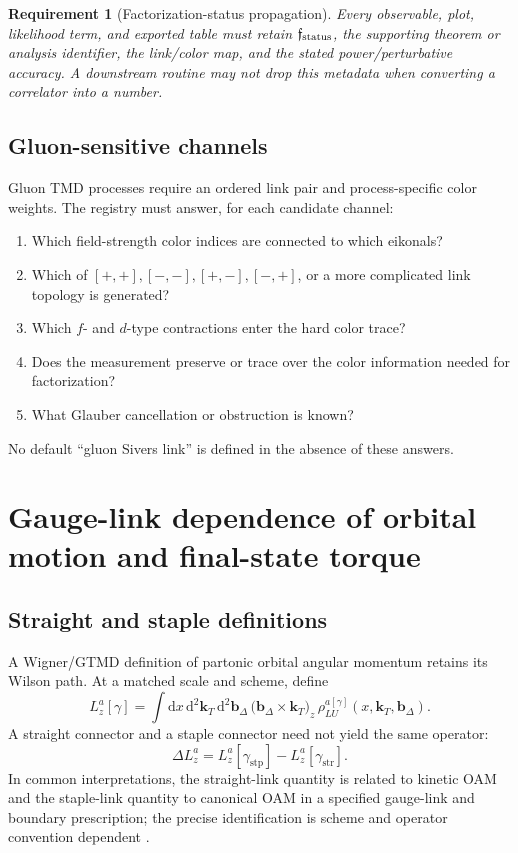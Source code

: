 \documentclass[11pt]{article}
\newtheorem{requirement}[definition]{Requirement}
\newcommand{\kT}{\bm{k}_{T}}
\newcommand{\bD}{\bm{b}_{\Delta}}
\newcommand{\dd}{\mathrm{d}}
\newcommand{\crossT}[2]{\bigl(#1\!\times\!#2\bigr)_z}
\newcommand{\straight}{\mathrm{str}}
\newcommand{\staple}{\mathrm{stp}}
\begin{document}
\begin{requirement}[Factorization-status propagation]
\label{req:factorization-status-propagation}
Every observable, plot, likelihood term, and exported table must retain
\(\mathfrak f_{\rm status}\), the supporting theorem or analysis identifier,
the link/color map, and the stated power/perturbative accuracy.  A downstream
routine may not drop this metadata when converting a correlator into a number.
\end{requirement}

\subsection{Gluon-sensitive channels}

Gluon TMD processes require an ordered link pair and process-specific color
weights.  The registry must answer, for each candidate channel:
\begin{enumerate}
\item Which field-strength color indices are connected to which eikonals?
\item Which of \([+,+],[-,-],[+,-],[-,+]\), or a more complicated link
      topology is generated?
\item Which \(f\)- and \(d\)-type contractions enter the hard color trace?
\item Does the measurement preserve or trace over the color information needed
      for factorization?
\item What Glauber cancellation or obstruction is known?
\end{enumerate}
No default ``gluon Sivers link'' is defined in the absence of these answers.

\section{Gauge-link dependence of orbital motion and final-state torque}
\label{sec:oam-torque}

\subsection{Straight and staple definitions}

A Wigner/GTMD definition of partonic orbital angular momentum retains its
Wilson path.  At a matched scale and scheme, define
\begin{equation}
 L_z^a[\gamma]
 =\int \dd x\,\dd^2\kT\,\dd^2\bD\,
 \crossT{\bD}{\kT}\,
 \rho_{LU}^{a[\gamma]}(x,\kT,\bD).
\label{eq:path-dependent-oam}
\end{equation}
A straight connector and a staple connector need not yield the same operator:
\begin{equation}
 \Delta L_z^a
 =L_z^a[\gamma_{\staple}]-L_z^a[\gamma_{\straight}].
\label{eq:oam-difference}
\end{equation}
In common interpretations, the straight-link quantity is related to kinetic
OAM and the staple-link quantity to canonical OAM in a specified gauge-link
and boundary prescription; the precise identification is scheme and operator
convention dependent \cite{LorcePasquini2011,Hatta2012,Burkardt2013}.
\end{document}
